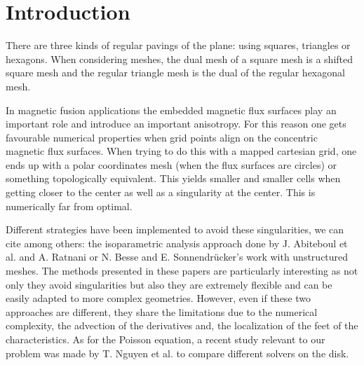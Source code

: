 \documentclass[proc]{edpsmath}
\begin{document}
\maketitle


\section*{Introduction}


There are three kinds of regular pavings of the plane: using squares, triangles or hexagons. When considering meshes, the dual mesh of a square mesh is a shifted square mesh and the regular triangle mesh is the dual of the regular hexagonal mesh.

In magnetic fusion applications the embedded magnetic flux surfaces play an important role and introduce an important anisotropy\cite{Angelino2009}. For this reason one gets favourable numerical properties when grid points align on the concentric magnetic flux surfaces. When trying to do this with a mapped cartesian grid, one ends up with a polar coordinates mesh (when the flux surfaces are circles) or something topologically equivalent. This yields smaller and smaller cells when getting closer to the center as well as a singularity at the center. This is numerically far from optimal. 

Different strategies have been implemented to avoid these singularities, we can cite among others: the isoparametric analysis approach done by J. Abiteboul et al. \cite{abiteboul2011solving} and A. Ratnani \cite{ratnani2011isogeometric} or N. Besse and E. Sonnendr\"{u}cker's work with unstructured meshes\cite{Besse2003341}. The methods presented in these papers are particularly interesting as not only they avoid singularities but also they are extremely flexible and can be easily adapted to more complex geometries. However, even if these two approaches are different, they share the limitations due to the numerical complexity, the advection of the derivatives and, the localization of the feet of the characteristics. 
As for the Poisson equation, a recent study relevant to our problem was made by T. Nguyen et al.\cite{axioms3020280} to compare different solvers on the disk. 
\end{document}
